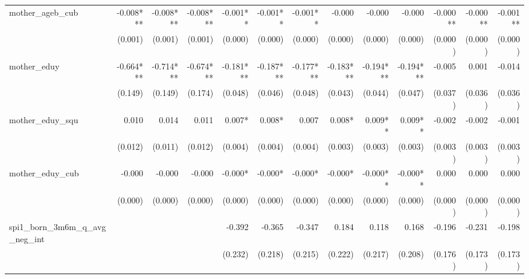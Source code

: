 \begin{tabular}{lrrrrrrrrrrrr}
mother\_ageb\_cub                           &    -0.008*** &    -0.008*** &    -0.008*** &     -0.001** &     -0.001** &     -0.001** &       -0.000 &       -0.000 &       -0.000 &     -0.000** &     -0.000** &     -0.001** \\ 
                                            &      (0.001) &      (0.001) &      (0.001) &      (0.000) &      (0.000) &      (0.000) &      (0.000) &      (0.000) &      (0.000) &      (0.000) &      (0.000) &      (0.000) \\ 
mother\_eduy                                &    -0.664*** &    -0.714*** &    -0.674*** &    -0.181*** &    -0.187*** &    -0.177*** &    -0.183*** &    -0.194*** &    -0.194*** &       -0.005 &        0.001 &       -0.014 \\ 
                                            &      (0.149) &      (0.149) &      (0.174) &      (0.048) &      (0.046) &      (0.048) &      (0.043) &      (0.044) &      (0.047) &      (0.037) &      (0.036) &      (0.036) \\ 
mother\_eduy\_squ                           &        0.010 &        0.014 &        0.011 &       0.007* &       0.008* &        0.007 &       0.008* &      0.009** &      0.009** &       -0.002 &       -0.002 &       -0.001 \\ 
                                            &      (0.012) &      (0.011) &      (0.012) &      (0.004) &      (0.004) &      (0.004) &      (0.003) &      (0.003) &      (0.003) &      (0.003) &      (0.003) &      (0.003) \\ 
mother\_eduy\_cub                           &       -0.000 &       -0.000 &       -0.000 &      -0.000* &      -0.000* &      -0.000* &      -0.000* &     -0.000** &     -0.000** &        0.000 &        0.000 &        0.000 \\ 
                                            &      (0.000) &      (0.000) &      (0.000) &      (0.000) &      (0.000) &      (0.000) &      (0.000) &      (0.000) &      (0.000) &      (0.000) &      (0.000) &      (0.000) \\ 
spi1\_born\_3m6m\_q\_avg\_neg\_int          &              &              &              &       -0.392 &       -0.365 &       -0.347 &        0.184 &        0.118 &        0.168 &       -0.196 &       -0.231 &       -0.198 \\ 
                                            &              &              &              &      (0.232) &      (0.218) &      (0.215) &      (0.222) &      (0.217) &      (0.208) &      (0.176) &      (0.173) &      (0.173) \\ 

\end{tabular}
